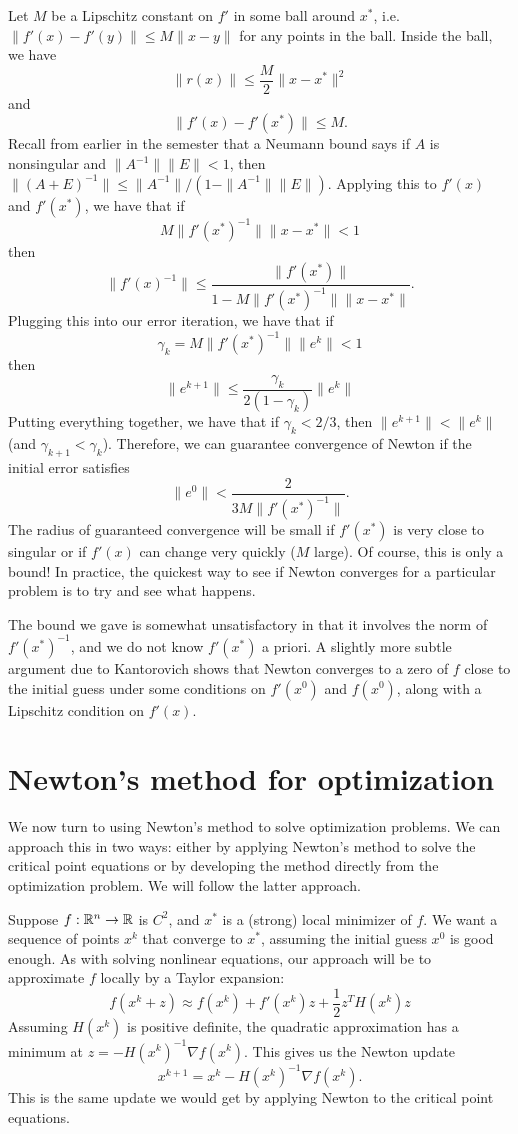 \documentclass[12pt, leqno]{article} %
\begin{document}
Let $M$ be a Lipschitz constant on $f'$ in some ball around $x^*$,
i.e.  $\|f'(x)-f'(y)\| \leq M \|x-y\|$ for any points in the ball.
Inside the ball, we have
\[
  \|r(x)\| \leq \frac{M}{2} \|x-x^*\|^2
\]
and
\[
  \|f'(x)-f'(x^*)\| \leq M.
\]
Recall from earlier in the semester that a Neumann bound says
if $A$ is nonsingular and $\|A^{-1}\| \|E\| < 1$, then
$\|(A+E)^{-1}\| \leq \|A^{-1}\| / (1-\|A^{-1}\| \|E\|)$.
Applying this to $f'(x)$ and $f'(x^*)$, we have that if
\[
  M \|f'(x^*)^{-1}\| \|x-x^*\| < 1
\]
then
\[
  \|f'(x)^{-1}\| \leq \frac{\|f'(x^*)\|}{1-M \|f'(x^*)^{-1}\|\|x-x^*\|}.
\]  
Plugging this into our error iteration, we have that if
\[
  \gamma_k = M \|f'(x^*)^{-1}\| \|e^k\| < 1
\]
then
\[
  \|e^{k+1}\| \leq \frac{\gamma_k}{2 (1-\gamma_k)} \|e^k\|
\]
Putting everything together, we have that if $\gamma_k < 2/3$, then
$\|e^{k+1}\| < \|e^k\|$ (and $\gamma_{k+1} < \gamma_k$).  Therefore,
we can guarantee convergence of Newton if the initial error satisfies
\[
  \|e^0\| < \frac{2}{3 M \|f'(x^*)^{-1}\|}.
\]
The radius of guaranteed convergence will be small if $f'(x^*)$ is
very close to singular or if $f'(x)$ can change very quickly ($M$
large).  Of course, this is only a bound!  In practice, the quickest
way to see if Newton converges for a particular problem is to try
and see what happens.

The bound we gave is somewhat unsatisfactory in that it involves
the norm of $f'(x^*)^{-1}$, and we do not know $f'(x^*)$ a priori.
A slightly more subtle argument due to Kantorovich shows that Newton
converges to a zero of $f$ close to the initial guess under some
conditions on $f'(x^0)$ and $f(x^0)$, along with a Lipschitz condition
on $f'(x)$.

\section*{Newton's method for optimization}

We now turn to using Newton's method to solve optimization problems.
We can approach this in two ways: either by applying Newton's method
to solve the critical point equations or by developing the method
directly from the optimization problem.  We will follow the latter
approach.

Suppose $f : \mathbb{R}^n \rightarrow \mathbb{R}$ is $C^2$, and $x^*$ is a
(strong) local minimizer of $f$.  We want a sequence of points $x^k$
that converge to $x^*$, assuming the initial guess $x^0$ is good
enough.  As with solving nonlinear equations, our approach will be
to approximate $f$ locally by a Taylor expansion:
\[
  f(x^k + z) \approx f(x^k) + f'(x^k) z + \frac{1}{2} z^T H(x^k) z
\]
Assuming $H(x^k)$ is positive definite, the quadratic approximation
has a minimum at $z = -H(x^k)^{-1} \nabla f(x^k)$.  This gives us the
Newton update
\[
  x^{k+1} = x^k - H(x^k)^{-1} \nabla f(x^k).
\]
This is the same update we would get by applying Newton to the
critical point equations.
\end{document}
